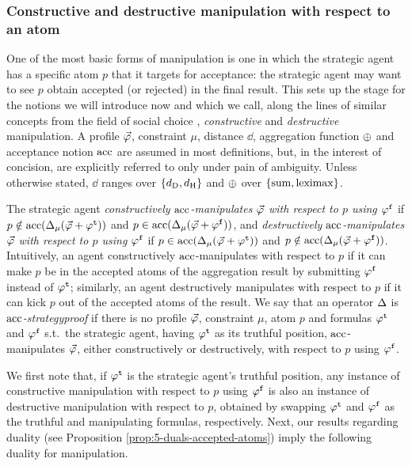 \subsubsection{Constructive and destructive manipulation with respect to an atom}
One of the most basic forms of manipulation is one in which
the strategic agent has a specific atom $p$ that it targets for acceptance: 
the strategic agent may want to see $p$ obtain accepted (or rejected) in the final result.
This sets up the stage for the notions we will introduce now
and which we call,
along the lines of similar concepts from the field of social choice \cite{ConitzerW2016},
\emph{constructive} and \emph{destructive} manipulation.
A profile $\P$, 
constraint $\mu$,
distance $\dd$, 
aggregation function $\agg$ and acceptance notion $\acc$
are assumed in most definitions,
but, in the interest of concision,
are explicitly referred to only under pain of ambiguity.
Unless otherwise stated, $\dd$ ranges over $\{\dd_\drastic,\dd_\hamming\}$ 
and $\agg$ over $\{\ssum,\leximax\}$.

The strategic agent \emph{constructively $\acc$-manipulates $\P$ with respect to $p$ using $\manip{\phi}$} 
if $p\notin\acc(\me_\mu(\P+\truth{\phi}))$ and $p\in\acc(\me_\mu(\P+\manip{\phi}))$,
and \emph{destructively $\acc$-manipulates $\P$ with respect to $p$ using $\manip{\phi}$} 
if $p\in\acc(\me_\mu(\P+\truth{\phi}))$ and $p\notin\acc(\me_\mu(\P+\manip{\phi}))$.
Intuitively, an agent constructively $\acc$-manipulates with respect to $p$ if it can make
$p$ be in the accepted atoms of the aggregation result by submitting $\manip{\phi}$ instead of $\truth{\phi}$;
similarly, an agent destructively manipulates with respect to $p$ 
if it can kick $p$ out of the accepted atoms of the result.
We say that an operator $\me$ is \emph{$\acc$-strategyproof}
if there is no profile $\P$, constraint $\mu$, atom $p$ and formulas $\truth{\phi}$ and $\manip{\phi}$ s.t.\  
the strategic agent, having $\truth{\phi}$ as its truthful position,
$\acc$-manipulates $\P$, either constructively or destructively,
with respect to $p$ using $\manip{\phi}$. 

We first note that,
if $\truth{\phi}$ is the strategic agent's truthful position,
any instance of constructive manipulation with respect to $p$ using $\manip{\phi}$
is also an instance of destructive manipulation with respect to $p$, obtained by swapping
$\truth{\phi}$ and $\manip{\phi}$ as the truthful and manipulating formulas, respectively.
Next, our results regarding duality 
(see Proposition \ref{prop:5-duals-accepted-atoms}) imply the following duality for manipulation. 

